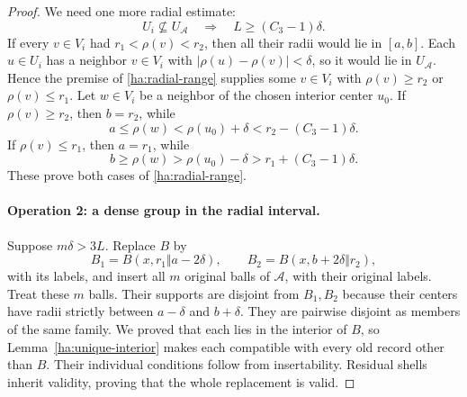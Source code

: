 \documentclass[11pt]{amsart}
\theoremstyle{definition}
\theoremstyle{remark}
\numberwithin{equation}{section}
\begin{document}
\begin{proof}
We need one more radial estimate:
\begin{equation}
 U_i\not\subseteq U_{\mathcal A}
       \quad\Longrightarrow\quad L\geq(C_3-1)\delta.
 \label{ha:radial-range}
\end{equation}
If every $v\in V_i$ had $r_1<\rho(v)<r_2$, then all their radii would
lie in $[a,b]$.  Each $u\in U_i$ has a neighbor $v\in V_i$ with
$|\rho(u)-\rho(v)|<\delta$, so it would lie in $U_{\mathcal A}$.
Hence the premise of \eqref{ha:radial-range} supplies some $v\in V_i$
with $\rho(v)\geq r_2$ or $\rho(v)\leq r_1$.  Let $w\in V_i$ be a
neighbor of the chosen interior center $u_0$.
If $\rho(v)\geq r_2$, then $b=r_2$, while
\[
 a\leq\rho(w)<\rho(u_0)+\delta
                  <r_2-(C_3-1)\delta.
\]
If $\rho(v)\leq r_1$, then $a=r_1$, while
\[
 b\geq\rho(w)>\rho(u_0)-\delta
                  >r_1+(C_3-1)\delta.
\]
These prove both cases of \eqref{ha:radial-range}.

\paragraph{\textbf{Operation 2: a dense group in the radial interval.}}
Suppose $m\delta>3L$.  Replace $B$ by
\[
 B_1=B(x,r_1\Vert a-2\delta),\qquad
 B_2=B(x,b+2\delta\Vert r_2),
\]
with its labels, and insert all $m$ original balls of $\mathcal A$,
with their original labels.  Treat these $m$ balls.  Their supports are
disjoint from $B_1,B_2$ because their centers have radii strictly
between $a-\delta$ and $b+\delta$.  They are pairwise disjoint as
members of the same family.  We proved that each lies in the interior
of $B$, so Lemma~\ref{ha:unique-interior} makes each compatible with
every old record other than $B$.  Their individual conditions follow
from insertability.  Residual shells inherit validity, proving that
the whole replacement is valid.


\end{proof}
\end{document}
